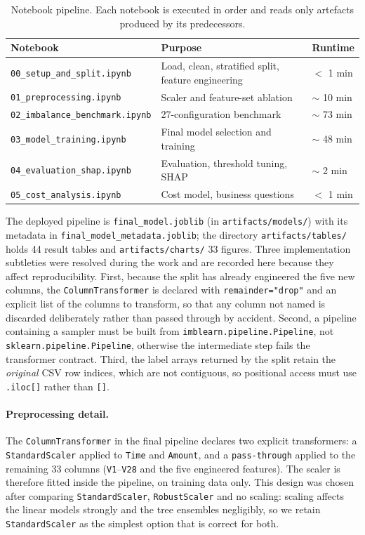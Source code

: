 \begin{table}[h!]
\centering
\caption{Notebook pipeline. Each notebook is executed in order and reads only
artefacts produced by its predecessors.}
\label{tab:notebooks}
\scriptsize
\setlength{\tabcolsep}{3pt}
\begin{tabular}{p{4.7cm}p{4.5cm}p{3.6cm}}
\toprule
\textbf{Notebook} & \textbf{Purpose} & \textbf{Runtime} \\
\midrule
\texttt{00\_setup\_and\_split.ipynb} & Load, clean, stratified split, feature engineering & $<$ 1 min \\
\texttt{01\_preprocessing.ipynb} & Scaler and feature-set ablation & $\sim$ 10 min \\
\texttt{02\_imbalance\_benchmark.ipynb} & 27-configuration benchmark & $\sim$ 73 min \\
\texttt{03\_model\_training.ipynb} & Final model selection and training & $\sim$ 48 min \\
\texttt{04\_evaluation\_shap.ipynb} & Evaluation, threshold tuning, SHAP & $\sim$ 2 min \\
\texttt{05\_cost\_analysis.ipynb} & Cost model, business questions & $<$ 1 min \\
\bottomrule
\end{tabular}
\end{table}

The deployed pipeline is \texttt{final\_model.joblib} (in
\texttt{artifacts/models/}) with its metadata in
\texttt{final\_model\_metadata.joblib}; the directory \texttt{artifacts/tables/}
holds 44 result tables and \texttt{artifacts/charts/} 33 figures.
Three implementation subtleties were resolved during the work and are recorded
here because they affect reproducibility. First, because the split has already
engineered the five new columns, the \texttt{ColumnTransformer} is declared
with \texttt{remainder="drop"} and an explicit list of the columns to
transform, so that any column not named is discarded deliberately rather than
passed through by accident. Second, a pipeline
containing a sampler must be built from \texttt{imblearn.pipeline.Pipeline},
not \texttt{sklearn.pipeline.Pipeline}, otherwise the intermediate step fails the
transformer contract. Third, the label arrays returned by the split retain the
\emph{original} CSV row indices, which are not contiguous, so positional access
must use \texttt{.iloc[]} rather than \texttt{[]}.

\paragraph{Preprocessing detail.} The \texttt{ColumnTransformer} in the final
pipeline declares two explicit transformers: a \texttt{StandardScaler} applied
to \texttt{Time} and \texttt{Amount}, and a \texttt{pass-through} applied to the
remaining 33 columns (\texttt{V1}--\texttt{V28} and the five engineered
features). The scaler is therefore fitted inside the pipeline, on training data
only. This design was chosen after comparing \texttt{StandardScaler},
\texttt{RobustScaler} and no scaling: scaling affects the linear models
strongly and the tree ensembles negligibly, so we retain
\texttt{StandardScaler} as the simplest option that is correct for both.

